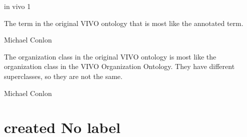 \documentclass[letterpaper,10pt,english]{sphinxmanual}
\begin{document}
\begin{sphinxShadowBox}

\sphinxAtStartPar
in vivo 1
\end{sphinxShadowBox}

\begin{sphinxShadowBox}

\sphinxAtStartPar
The term in the original VIVO ontology that is most like the annotated term.
\end{sphinxShadowBox}

\begin{sphinxShadowBox}

\sphinxAtStartPar
Michael Conlon 
\end{sphinxShadowBox}

\begin{sphinxShadowBox}

\sphinxAtStartPar
The organization class in the original VIVO ontology is most like the organization class in the VIVO Organization Ontology.  They have different superclasses, so they are not the same.
\end{sphinxShadowBox}

\begin{sphinxShadowBox}

\sphinxAtStartPar
Michael Conlon 
\end{sphinxShadowBox}
\begin{quote}
\label{\detokenize{doc-created:created}}\label{\detokenize{doc-created:no-label}}\label{\detokenize{doc-created:created}}
\ignorespaces \end{quote}


\section{created \sphinxhyphen{} No label}
\label{\detokenize{doc-created:created-no-label}}\label{\detokenize{doc-created:index-0}}\label{\detokenize{doc-created::doc}}\begin{quote}
\label{\detokenize{doc-creator:creator}}\label{\detokenize{doc-creator:no-label}}\label{\detokenize{doc-creator:creator}}
\ignorespaces \end{quote}
\end{document}
